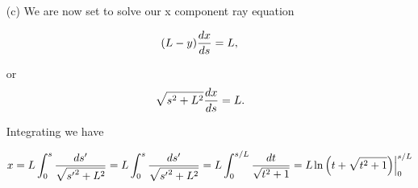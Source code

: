 {\begin{enumerate}
Let's look at the small limit where $s \ll L$

\begin{dmath}\label{eqn:modernOpticsProblemSet1P2:250}
y(s)
\sim L \left( 1 - \left( 1 + \inv{2} \left(\frac{s}{L}\right)^2 \right) \right),
\end{dmath}

\begin{equation}\label{eqn:modernOpticsProblemSet1P2:1890}
\myBoxed{
y(s) \sim -\frac{s^2}{2 L} \quad \mbox{when $ s \ll L$}.
}
\end{equation}

In the large limit for $s \gg L$ the $s^2$ term dominates, leaving

\begin{dmath}\label{eqn:modernOpticsProblemSet1P2:270}
\myBoxed{
y(s) \sim - s \quad \mbox{when $s \gg L$}.
}
\end{dmath}

A plot of $y/L$, $-s/L$, and $-s^2/2 L^2$ can be found in \cref{fig:modernOpticsProblemSet1:modernOpticsProblemSet1Fig2b} and \cref{fig:modernOpticsProblemSet1:modernOpticsProblemSet1Fig2bBig}.


\item[(c)]
We are now set to solve our x component ray equation

\begin{dmath}\label{eqn:modernOpticsProblemSet1P2:290}
(L - y) \dds{x} = L,
\end{dmath}

or
\begin{dmath}\label{eqn:modernOpticsProblemSet1P2:310}
\sqrt{s^2 + L^2} \dds{x} = L.
\end{dmath}

Integrating we have

\begin{dmath}\label{eqn:modernOpticsProblemSet1P2:330}
x
= L \int_0^s \frac{ds'}{\sqrt{{s'}^2 + L^2}}
= L \int_0^s \frac{ds'}{\sqrt{{s'}^2 + L^2}}
= L \int_0^{s/L} \frac{dt}{\sqrt{t^2 + 1}}
= L \evalrange{ \ln\left( t + \sqrt{ t^2 + 1} \right) }{0}{s/L}
\end{dmath}


\end{enumerate}}
